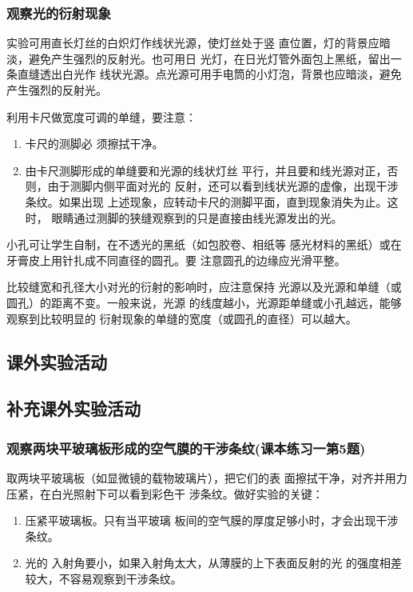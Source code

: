 \subsubsection{观察光的衍射现象}
实验可用直长灯丝的白炽灯作线状光源，使灯丝处于竖
直位置，灯的背景应暗淡，避免产生强烈的反射光。也可用日
光灯，在日光灯管外面包上黑纸，留出一条直缝透出白光作
线状光源。点光源可用手电筒的小灯泡，背景也应暗淡，避免
产生强烈的反射光。

利用卡尺做宽度可调的单缝，要注意：
\begin{enumerate}
\item 卡尺的测脚必
须擦拭干净。
\item 由卡尺测脚形成的单缝要和光源的线状灯丝
平行，并且要和线光源对正，否则，由于测脚内侧平面对光的
反射，还可以看到线状光源的虚像，出现干涉条纹。如果出现
上述现象，应转动卡尺的测脚平面，直到现象消失为止。这时，
眼睛通过测脚的狭缝观察到的只是直接由线光源发出的光。
\end{enumerate}

小孔可让学生自制，在不透光的黑纸（如包胶卷、相纸等
感光材料的黑纸）或在牙膏皮上用针扎成不同直径的圆孔。要
注意圆孔的边缘应光滑平整。

比较缝宽和孔径大小对光的衍射的影响时，应注意保持
光源以及光源和单缝（或圆孔）的距离不变。一般来说，光源
的线度越小，光源距单缝或小孔越远，能够观察到比较明显的
衍射现象的单缝的宽度（或圆孔的直径）可以越大。

\subsection{课外实验活动}
\subsection*{补充课外实验活动}

\subsubsection{观察两块平玻璃板形成的空气膜的干涉条纹(课本练习一第5题)}

取两块平玻璃板（如显微镜的载物玻璃片），把它们的表
面擦拭干净，对齐并用力压紧，在白光照射下可以看到彩色干
涉条纹。做好实验的关键：
\begin{enumerate}
\item 压紧平玻璃板。只有当平玻璃
板间的空气膜的厚度足够小时，才会出现干涉条纹。   
\item 光的
入射角要小，如果入射角太大，从薄膜的上下表面反射的光
的强度相差较大，不容易观察到干涉条纹。
\end{enumerate}

